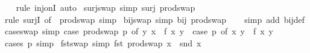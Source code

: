 \begin{isabellebody}
%
\isadelimproof
\ \ %
\endisadelimproof
%
\isatagproof
{}\isamarkupfalse%
\ {\isacharparenleft}{\kern0pt}rule\ inj{\isacharunderscore}{\kern0pt}onI{\isacharparenright}{\kern0pt}\ auto%
\endisatagproof
{\isafoldproof}%
%
\isadelimproof
\isanewline
%
\endisadelimproof
\isanewline
{}\isamarkupfalse%
\ surj{\isacharunderscore}{\kern0pt}swap\ {\isacharbrackleft}{\kern0pt}simp{\isacharbrackright}{\kern0pt}{\isacharcolon}{\kern0pt}\ {\isachardoublequoteopen}surj\ prod{\isachardot}{\kern0pt}swap{\isachardoublequoteclose}\isanewline
%
\isadelimproof
\ \ %
\endisadelimproof
%
\isatagproof
{}\isamarkupfalse%
\ {\isacharparenleft}{\kern0pt}rule\ surjI\ {\isacharbrackleft}{\kern0pt}of\ {\isacharunderscore}{\kern0pt}\ prod{\isachardot}{\kern0pt}swap{\isacharbrackright}{\kern0pt}{\isacharparenright}{\kern0pt}\ simp%
\endisatagproof
{\isafoldproof}%
%
\isadelimproof
\isanewline
%
\endisadelimproof
\isanewline
{}\isamarkupfalse%
\ bij{\isacharunderscore}{\kern0pt}swap\ {\isacharbrackleft}{\kern0pt}simp{\isacharbrackright}{\kern0pt}{\isacharcolon}{\kern0pt}\ {\isachardoublequoteopen}bij\ prod{\isachardot}{\kern0pt}swap{\isachardoublequoteclose}\isanewline
%
\isadelimproof
\ \ %
\endisadelimproof
%
\isatagproof
{}\isamarkupfalse%
\ {\isacharparenleft}{\kern0pt}simp\ add{\isacharcolon}{\kern0pt}\ bij{\isacharunderscore}{\kern0pt}def{\isacharparenright}{\kern0pt}%
\endisatagproof
{\isafoldproof}%
%
\isadelimproof
\isanewline
%
\endisadelimproof
\isanewline
{}\isamarkupfalse%
\ case{\isacharunderscore}{\kern0pt}swap\ {\isacharbrackleft}{\kern0pt}simp{\isacharbrackright}{\kern0pt}{\isacharcolon}{\kern0pt}\ {\isachardoublequoteopen}{\isacharparenleft}{\kern0pt}case\ prod{\isachardot}{\kern0pt}swap\ p\ of\ {\isacharparenleft}{\kern0pt}y{\isacharcomma}{\kern0pt}\ x{\isacharparenright}{\kern0pt}\ {\isasymRightarrow}\ f\ x\ y{\isacharparenright}{\kern0pt}\ {\isacharequal}{\kern0pt}\ {\isacharparenleft}{\kern0pt}case\ p\ of\ {\isacharparenleft}{\kern0pt}x{\isacharcomma}{\kern0pt}\ y{\isacharparenright}{\kern0pt}\ {\isasymRightarrow}\ f\ x\ y{\isacharparenright}{\kern0pt}{\isachardoublequoteclose}\isanewline
%
\isadelimproof
\ \ %
\endisadelimproof
%
\isatagproof
{}\isamarkupfalse%
\ {\isacharparenleft}{\kern0pt}cases\ p{\isacharparenright}{\kern0pt}\ simp%
\endisatagproof
{\isafoldproof}%
%
\isadelimproof
\isanewline
%
\endisadelimproof
\isanewline
{}\isamarkupfalse%
\ fst{\isacharunderscore}{\kern0pt}swap\ {\isacharbrackleft}{\kern0pt}simp{\isacharbrackright}{\kern0pt}{\isacharcolon}{\kern0pt}\ {\isachardoublequoteopen}fst\ {\isacharparenleft}{\kern0pt}prod{\isachardot}{\kern0pt}swap\ x{\isacharparenright}{\kern0pt}\ {\isacharequal}{\kern0pt}\ snd\ x{\isachardoublequoteclose}\isanewline

\end{isabellebody}
